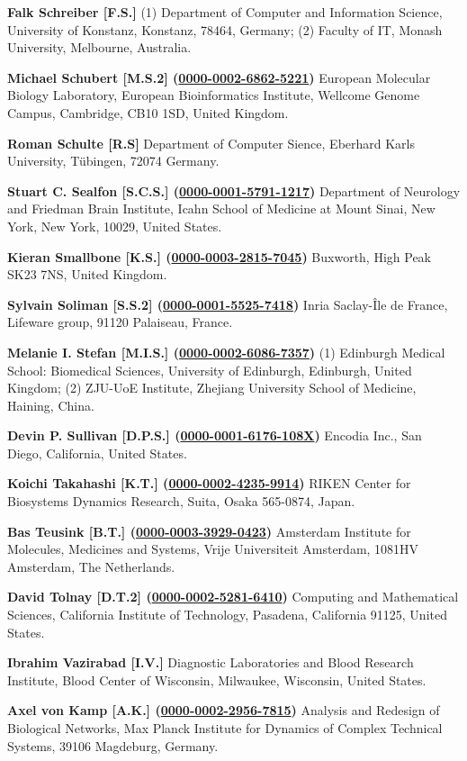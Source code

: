 \documentclass{sbml-paper}
\newcommand{\orcid}[1]{\href{https://orcid.org/#1}{#1}}
\begin{document}
\textbf{Falk Schreiber [F.S.]} (1) Department of Computer and Information Science, University of Konstanz, Konstanz, 78464, Germany; (2) Faculty of IT, Monash University, Melbourne, Australia.

\textbf{Michael Schubert [M.S.2] (\orcid{0000-0002-6862-5221})} European Molecular Biology Laboratory, European Bioinformatics Institute, Wellcome Genome Campus, Cambridge, CB10 1SD, United Kingdom.

\textbf{Roman Schulte [R.S]} Department of Computer Sience, Eberhard Karls University, Tübingen, 72074 Germany.

\textbf{Stuart C. Sealfon [S.C.S.] (\orcid{0000-0001-5791-1217})} Department of Neurology and Friedman Brain Institute, Icahn School of Medicine at Mount Sinai, New York, New York, 10029, United States.

\textbf{Kieran Smallbone [K.S.] (\orcid{0000-0003-2815-7045})} Buxworth, High Peak SK23 7NS, United Kingdom.

\textbf{Sylvain Soliman [S.S.2] (\orcid{0000-0001-5525-7418})} Inria Saclay-Île de France, Lifeware group, 91120 Palaiseau, France.

\textbf{Melanie I. Stefan [M.I.S.] (\orcid{0000-0002-6086-7357})} (1) Edinburgh Medical School: Biomedical Sciences, University of Edinburgh, Edinburgh, United Kingdom; (2) ZJU-UoE Institute, Zhejiang University School of Medicine, Haining, China.

\textbf{Devin P. Sullivan [D.P.S.] (\orcid{0000-0001-6176-108X})} Encodia Inc., San Diego, California, United States.

\textbf{Koichi Takahashi [K.T.] (\orcid{0000-0002-4235-9914})} RIKEN Center for Biosystems Dynamics Research, Suita, Osaka 565-0874, Japan.

\textbf{Bas Teusink [B.T.] (\orcid{0000-0003-3929-0423})} Amsterdam Institute for Molecules, Medicines and Systems, Vrije Universiteit Amsterdam, 1081HV Amsterdam, The Netherlands.

\textbf{David Tolnay [D.T.2] (\orcid{0000-0002-5281-6410})} Computing and Mathematical Sciences, California Institute of Technology, Pasadena, California 91125, United States.

\textbf{Ibrahim Vazirabad [I.V.]} Diagnostic Laboratories and Blood Research Institute, Blood Center of Wisconsin, Milwaukee, Wisconsin, United States.

\textbf{Axel von Kamp [A.K.] (\orcid{0000-0002-2956-7815})} Analysis and Redesign of Biological Networks, Max Planck Institute for Dynamics of Complex Technical Systems, 39106 Magdeburg, Germany.
\end{document}
